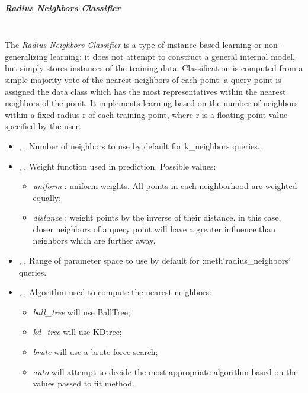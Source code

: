 \subparagraph{Radius Neighbors Classifier}
\mbox{}
\\The \textit{Radius Neighbors Classifier} is a type of instance-based learning
or non-generalizing learning: it does not attempt to construct a general
internal model, but simply stores instances of the training data.
%
Classification is computed from a simple majority vote of the nearest neighbors
of each point: a query point is assigned the data class which has the most
representatives within the nearest neighbors of the point.
%
It implements learning based on the number of neighbors within a fixed radius r
of each training point, where r is a floating-point value specified by the user.
%
\begin{itemize}
  \item {} , ,
  Number of neighbors to use by default for k\_neighbors queries..
  \item {} , ,
  Weight function used in prediction.
  Possible values:
\begin{itemize}
    \item \textit{uniform} : uniform weights.
    All points in each neighborhood are weighted equally;
    \item \textit{distance} : weight points by the inverse of their distance.
    in this case, closer neighbors of a query point will have a greater
    influence than neighbors which are further away.
\end{itemize}
  \item {} , ,
  Range of parameter space to use by default for :meth`radius\_neighbors`
  queries.
  \item {} , ,
  Algorithm used to compute the nearest neighbors:
\begin{itemize}
    \item \textit{ball\_tree} will use BallTree;
    \item \textit{kd\_tree} will use KDtree;
    \item \textit{brute} will use a brute-force search;
    \item \textit{auto} will attempt to decide the most appropriate algorithm
    based on the values passed to fit method.
\end{itemize}

\end{itemize}

